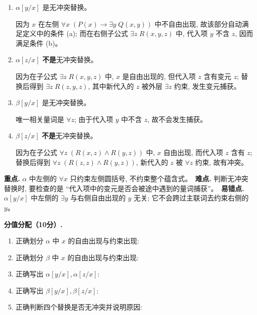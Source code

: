 \documentclass[a4paper, justified]{tufte-handout}
\begin{document}
\begin{solution}
\begin{enumerate}[(a)]
      \begin{enumerate}[(1)]
        \item $\alpha[y/x]$ 是无冲突替换。

          因为 $x$ 在左侧 $\forall x\; (P(x) \to \exists y\; Q(x, y))$ 中不自由出现,
          故该部分自动满足定义中的条件 (a);
          而在右侧子公式 $\exists z\; R(x, y, z)$ 中,
          代入项 $y$ 不含 $z$, 因而满足条件 (b)。

        \item $\alpha[z/x]$ \textbf{不是}无冲突替换。

          因为在子公式 $\exists z\; R(x, y, z)$ 中,
          $x$ 是自由出现的, 但代入项 $z$ 含有变元 $z$;
          替换后得到 $\exists z\; R(z, y, z)$,
          其中新代入的 $z$ 被外层 $\exists z$ 约束, 发生变元捕获。

        \item $\beta[y/x]$ 是无冲突替换。

          唯一相关量词是 $\forall z$; 由于代入项 $y$ 中不含 $z$,
          故不会发生捕获。

        \item $\beta[z/x]$ \textbf{不是}无冲突替换。

          因为在子公式 $\forall z\; (R(x, z) \land R(y, z))$ 中,
          $x$ 自由出现, 而代入项 $z$ 含有 $z$;
          替换后得到 $\forall z\; (R(z, z) \land R(y, z))$,
          新代入的 $z$ 被 $\forall z$ 约束, 故有冲突。
      \end{enumerate}
  \end{enumerate}

  \begin{remark}
    \textbf{重点.} $\alpha$ 中左侧的 $\forall x$ 只约束左侧圆括号, 不约束整个蕴含式。\
    \textbf{难点.} 判断无冲突替换时, 要检查的是 ``代入项中的变元是否会被途中遇到的量词捕获''。\
    \textbf{易错点.} $\alpha[y/x]$ 中左侧的 $\exists y$ 与右侧自由出现的 $y$ 无关; 它不会跨过主联词去约束右侧的 $y$。
  \end{remark}

  \textbf{分值分配（10分）.}
  \begin{enumerate}[(1)]
    \item 正确划分 $\alpha$ 中 $x$ 的自由出现与约束出现: 
    \item 正确划分 $\beta$ 中 $x$ 的自由出现与约束出现: 
    \item 正确写出 $\alpha[y/x], \alpha[z/x]$: \score{3}
    \item 正确写出 $\beta[y/x], \beta[z/x]$: 
    \item 正确判断四个替换是否无冲突并说明原因: \score{2}
  \end{enumerate}
\end{solution}
\end{document}
